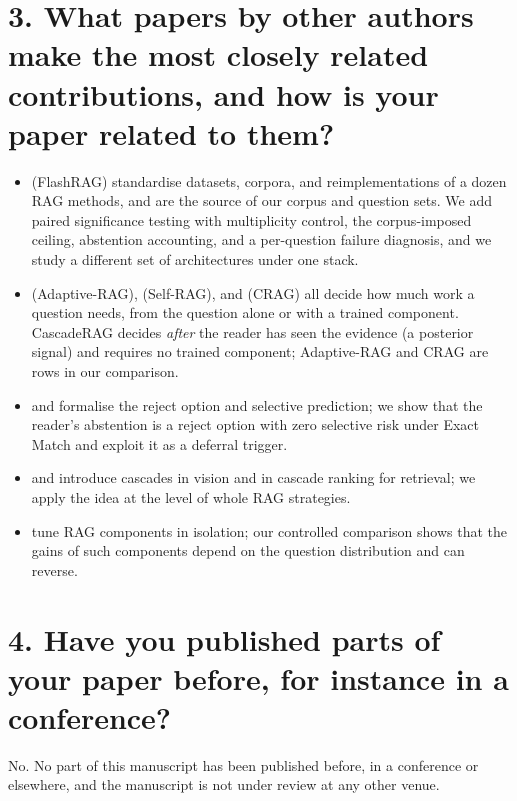 \documentclass[10pt,a4paper]{article}
\begin{document}
\section*{3. What papers by other authors make the most closely related
contributions, and how is your paper related to them?}

\begin{itemize}
\item \citet{jin2024flashrag} (FlashRAG) standardise datasets, corpora,
and reimplementations of a dozen RAG methods, and are the source of our
corpus and question sets. We add paired significance testing with
multiplicity control, the corpus-imposed ceiling, abstention accounting,
and a per-question failure diagnosis, and we study a different set of
architectures under one stack.
\item \citet{jeong2024adaptiverag} (Adaptive-RAG), \citet{asai2024selfrag}
(Self-RAG), and \citet{yan2024crag} (CRAG) all decide how much work a
question needs, from the question alone or with a trained component.
CascadeRAG decides \emph{after} the reader has seen the evidence (a
posterior signal) and requires no trained component; Adaptive-RAG and CRAG
are rows in our comparison.
\item \citet{chow1970reject} and \citet{geifman2017selective} formalise
the reject option and selective prediction; we show that the reader's
abstention is a reject option with zero selective risk under Exact Match
and exploit it as a deferral trigger.
\item \citet{viola2001cascade} and \citet{wang2011cascade} introduce
cascades in vision and in cascade ranking for retrieval; we apply the idea
at the level of whole RAG strategies.
\item \citet{wang2024bestpractices} tune RAG components in isolation; our
controlled comparison shows that the gains of such components depend on
the question distribution and can reverse.
\end{itemize}

\section*{4. Have you published parts of your paper before, for instance
in a conference?}

No. No part of this manuscript has been published before, in a conference
or elsewhere, and the manuscript is not under review at any other venue.


{\small}
\end{document}
